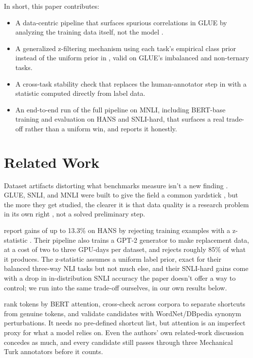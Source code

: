 \documentclass[conference]{IEEEtran}
\begin{document}
In short, this paper contributes:

\begin{itemize}
    \item A data-centric pipeline that surfaces spurious correlations in GLUE by analyzing the training data itself, not the model \cite{jakubik2024datacentric, wang2018glue}.
    \item A generalized z-filtering mechanism using each task's empirical class prior instead of the uniform prior in \cite{wu2022generating}, valid on GLUE's imbalanced and non-ternary tasks.
    \item A cross-task stability check that replaces the human-annotator step in \cite{wang2022identifying} with a statistic computed directly from label data.
    \item An end-to-end run of the full pipeline on MNLI, including BERT-base training and evaluation on HANS and SNLI-hard, that surfaces a real trade-off rather than a uniform win, and reports it honestly.
\end{itemize}

\section{Related Work}

Dataset artifacts distorting what benchmarks measure isn't a new finding \cite{wang2022identifying, mccoy2019right, gururangan2018annotation}. GLUE, SNLI, and MNLI were built to give the field a common yardstick \cite{wang2018glue, bowman2015large, williams2018broad}, but the more they get studied, the clearer it is that data quality is a research problem in its own right \cite{geirhos2020shortcut}, not a solved preliminary step.

\cite{wu2022generating} report gains of up to 13.3\% on HANS by rejecting training examples with a z-statistic \cite{poliak2018hypothesis}. Their pipeline also trains a GPT-2 generator to make replacement data, at a cost of two to three GPU-days per dataset, and rejects roughly 85\% of what it produces. The z-statistic assumes a uniform label prior, exact for their balanced three-way NLI tasks but not much else, and their SNLI-hard gains come with a drop in in-distribution SNLI accuracy the paper doesn't offer a way to control; we run into the same trade-off ourselves, in our own results below.

\cite{wang2022identifying} rank tokens by BERT attention, cross-check across corpora to separate shortcuts from genuine tokens, and validate candidates with WordNet/DBpedia synonym perturbations. It needs no pre-defined shortcut list, but attention is an imperfect proxy for what a model relies on. Even the authors' own related-work discussion concedes as much, and every candidate still passes through three Mechanical Turk annotators before it counts.
\end{document}
